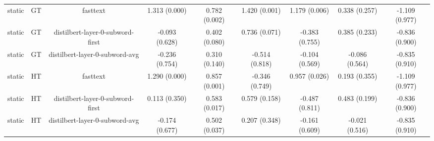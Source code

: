\begin{sidewaystable}[htb]
\begin{tabular}{@{}ccccccccc@{}}
        static & GT & fasttext & 1.313 (0.000) & 0.782 (0.002) & 1.420 (0.001) & 1.179 (0.006) & 0.338 (0.257) & -1.109 (0.977) \\
        static & GT & distilbert-layer-0-subword-first & -0.093 (0.628) & 0.402 (0.080) & 0.736 (0.071) & -0.383 (0.755) & 0.385 (0.233) & -0.836 (0.900) \\
        static & GT & distilbert-layer-0-subword-avg & -0.236 (0.754) & 0.310 (0.140) & -0.514 (0.818) & -0.104 (0.569) & -0.086 (0.564) & -0.835 (0.910) \\
        static & HT & fasttext & 1.290 (0.000) & 0.857 (0.001) & -0.346 (0.749) & 0.957 (0.026) & 0.193 (0.355) & -1.109 (0.977) \\
        static & HT & distilbert-layer-0-subword-first & 0.113 (0.350) & 0.583 (0.017) & 0.579 (0.158) & -0.487 (0.811) & 0.483 (0.199) & -0.836 (0.900) \\
        static & HT & distilbert-layer-0-subword-avg & -0.174 (0.677) & 0.502 (0.037) & 0.207 (0.348) & -0.161 (0.609) & -0.021 (0.516) & -0.835 (0.910) \\
        \bottomrule
    \end{tabular}
\end{sidewaystable}